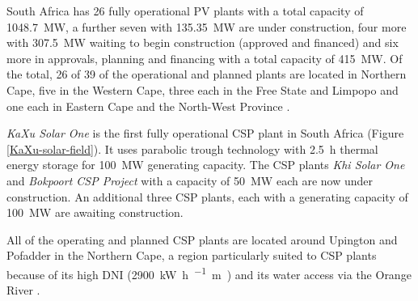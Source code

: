 South Africa has 26 fully operational PV plants with a total capacity of \SI{1048.7}{\mega\watt}, a further seven with \SI{135.35}{\mega\watt} are under construction, four more with \SI{307.5}{\mega\watt} waiting to begin construction (approved and financed) and six more in approvals, planning and financing with a total capacity of \SI{415}{\mega\watt}. Of the total, 26 of 39 of the operational and planned plants are located in Northern Cape, five in the Western Cape, three each in the Free State and Limpopo and one each in Eastern Cape and the North-West Province \cite{Forder2015}.


\emph{KaXu Solar One} is the first fully operational CSP plant in South Africa (Figure \ref{KaXu-solar-field}). It uses parabolic trough technology with \SI{2.5}{\hour} thermal energy storage for \SI{100}{\mega\watt} generating capacity. The CSP plants \emph{Khi Solar One} and \emph{Bokpoort CSP Project} with a capacity of \SI{50}{\mega\watt} each are now under construction. An additional three CSP plants, each with a generating capacity of \SI{100}{\mega\watt} are awaiting construction. 

All of the operating and planned CSP plants are located around Upington and Pofadder in the Northern Cape, a region particularly suited to CSP plants because of its high DNI (\SI{2900}{\kilo\watt\hour\per\squared\meter\year}) and its water access via the Orange River \cite{Forder2015}.

